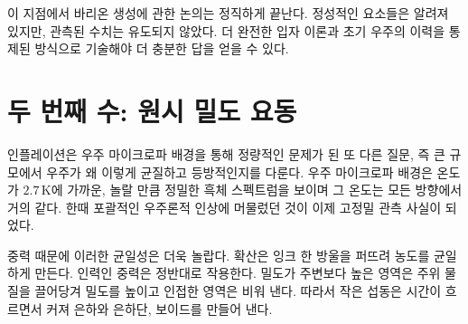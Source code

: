 \begin{classroomqa}
\end{classroomqa}

\begin{classroomqa}
\end{classroomqa}

이 지점에서 바리온 생성에 관한 논의는 정직하게 끝난다. 정성적인 요소들은 알려져 있지만, 관측된 수치는 유도되지 않았다. 더 완전한 입자 이론과 초기 우주의 이력을 통제된 방식으로 기술해야 더 충분한 답을 얻을 수 있다.

\section{두 번째 수: 원시 밀도 요동}

인플레이션은 우주 마이크로파 배경을 통해 정량적인 문제가 된 또 다른 질문, 즉 큰 규모에서 우주가 왜 이렇게 균질하고 등방적인지를 다룬다. 우주 마이크로파 배경은 온도가 \(2.7\,\mathrm K\)에 가까운, 놀랄 만큼 정밀한 흑체 스펙트럼을 보이며 그 온도는 모든 방향에서 거의 같다. 한때 포괄적인 우주론적 인상에 머물렀던 것이 이제 고정밀 관측 사실이 되었다.

중력 때문에 이러한 균일성은 더욱 놀랍다. 확산은 잉크 한 방울을 퍼뜨려 농도를 균일하게 만든다. 인력인 중력은 정반대로 작용한다. 밀도가 주변보다 높은 영역은 주위 물질을 끌어당겨 밀도를 높이고 인접한 영역은 비워 낸다. 따라서 작은 섭동은 시간이 흐르면서 커져 은하와 은하단, 보이드를 만들어 낸다.

